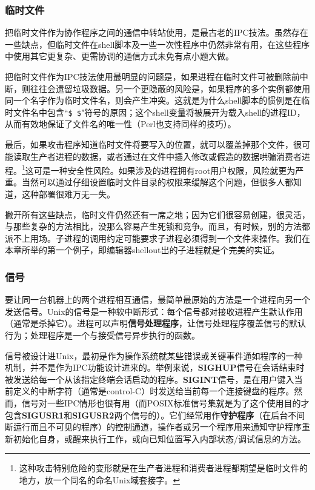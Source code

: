 \documentclass[12pt,oneside]{ctexbook}
\begin{document}
\begin{common-format}
\subsubsection{临时文件}
把临时文件作为协作程序之间的通信中转站使用，是最古老的IPC技法。虽然存在一些缺点，但临时文件在shell脚本及一些一次性程序中仍然非常有用，在这些程序中使用其它更复杂、更需协调的通信方式未免有点小题大做。

把临时文件作为IPC技法使用最明显的问题是，如果进程在临时文件可被删除前中断，则往往会遗留垃圾数据。另一个更隐蔽的风险是，如果程序的多个实例都使用同一个名字作为临时文件名，则会产生冲突。这就是为什么shell脚本的惯例是在临时文件名中包含“\verb+$ $+"符号的原因；这个shell变量将被展开为载入shell的进程ID，从而有效地保证了文件名的唯一性（Perl也支持同样的技巧）。

最后，如果攻击程序知道临时文件将要写入的位置，就可以覆盖掉那个文件，很可能读取生产者进程的数据，或者通过在文件中插入修改或假造的数据哄骗消费者进程。\footnote{这种攻击特别危险的变形就是在生产者进程和消费者进程都期望是临时文件的地方，放一个同名的命名Unix域套接字。}这可是一种安全性风险。如果涉及的进程拥有root用户权限，风险就更为严重。当然可以通过仔细设置临时文件目录的权限来缓解这个问题，但很多人都知道，这种部署很难万无一失。

撇开所有这些缺点，临时文件仍然还有一席之地；因为它们很容易创建，很灵活，与那些复杂的方法相比，没那么容易产生死锁和竞争。而且，有时候，别的方法都派不上用场。子进程的调用约定可能要求子进程必须得到一个文件来操作。我们在本章所举的第一个例子，即编辑器shellout出的子进程就是个完美的实证。


\subsubsection{信号}
要让同一台机器上的两个进程相互通信，最简单最原始的方法是一个进程向另一个发送信号。Unix的信号是一种软中断形式：每个信号都对接收进程产生默认作用（通常是杀掉它）。进程可以声明\textbf{信号处理程序}，让信号处理程序覆盖信号的默认行为；处理程序是一个与接受信号异步执行的函数。

信号被设计进Unix，最初是作为操作系统就某些错误或关键事件通如程序的一种机制，并不是作为IPC功能设计进来的。举例来说，\textbf{SIGHUP}信号在会话结束时被发送给每一个从该指定终端会话启动的程序。\textbf{SIGINT}信号，是在用户键入当前定义的中断字符（通常是control-C）时发送给当前每一个连接键盘的程序。然而，信号对一些IPC情形也很有用（而POSIX标准信号集就是为了这个使用目的才包含\textbf{SIGUSR1}和\textbf{SIGUSR2}两个信号的）。它们经常用作\textbf{守护程序}（在后台不间断运行而且不可见的程序）的控制通道，操作者或另一个程序用来通知守护程序重新初始化自身，或醒来执行工作，或向已知位置写入内部状态/调试信息的方法。


\end{common-format}
\end{document}
